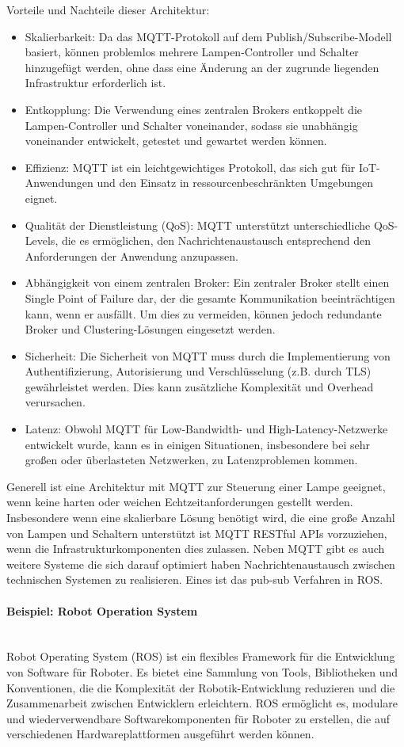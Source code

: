 \documentclass[../vs-script-first-v01.tex]{subfiles}
\begin{document}
Vorteile und Nachteile dieser Architektur: 
\begin{itemize}
\item Skalierbarkeit: Da das MQTT-Protokoll auf dem Publish/Subscribe-Modell basiert, können problemlos mehrere Lampen-Controller und Schalter hinzugefügt werden, ohne dass eine Änderung an der zugrunde liegenden Infrastruktur erforderlich ist.
\item Entkopplung: Die Verwendung eines zentralen Brokers entkoppelt die Lampen-Controller und Schalter voneinander, sodass sie unabhängig voneinander entwickelt, getestet und gewartet werden können.
\item Effizienz: MQTT ist ein leichtgewichtiges Protokoll, das sich gut für IoT-Anwendungen und den Einsatz in ressourcenbeschränkten Umgebungen eignet.
\item Qualität der Dienstleistung (QoS): MQTT unterstützt unterschiedliche QoS-Levels, die es ermöglichen, den Nachrichtenaustausch entsprechend den Anforderungen der Anwendung anzupassen.
\item Abhängigkeit von einem zentralen Broker: Ein zentraler Broker stellt einen Single Point of Failure dar, der die gesamte Kommunikation beeinträchtigen kann, wenn er ausfällt. Um dies zu vermeiden, können jedoch redundante Broker und Clustering-Lösungen eingesetzt werden.
\item Sicherheit: Die Sicherheit von MQTT muss durch die Implementierung von Authentifizierung, Autorisierung und Verschlüsselung (z.B. durch TLS) gewährleistet werden. Dies kann zusätzliche Komplexität und Overhead verursachen.
\item Latenz: Obwohl MQTT für Low-Bandwidth- und High-Latency-Netzwerke entwickelt wurde, kann es in einigen Situationen, insbesondere bei sehr großen oder überlasteten Netzwerken, zu Latenzproblemen kommen.
\end{itemize}

Generell ist eine Architektur mit MQTT zur Steuerung einer Lampe geeignet, wenn keine harten oder weichen Echtzeitanforderungen gestellt werden. Insbesondere wenn eine skalierbare Lösung benötigt wird, die eine große Anzahl von Lampen und Schaltern unterstützt ist MQTT RESTful APIs vorzuziehen, wenn die Infrastrukturkomponenten dies zulassen. 
Neben MQTT gibt es auch weitere Systeme die sich darauf optimiert haben Nachrichtenaustausch zwischen technischen Systemen zu realisieren. Eines ist das pub-sub Verfahren in ROS. 
\paragraph{Beispiel: Robot Operation System\\\\}
Robot Operating System (ROS) ist ein flexibles Framework für die Entwicklung von Software für Roboter. Es bietet eine Sammlung von Tools, Bibliotheken und Konventionen, die die Komplexität der Robotik-Entwicklung reduzieren und die Zusammenarbeit zwischen Entwicklern erleichtern. ROS ermöglicht es, modulare und wiederverwendbare Softwarekomponenten für Roboter zu erstellen, die auf verschiedenen Hardwareplattformen ausgeführt werden können.
\end{document}
